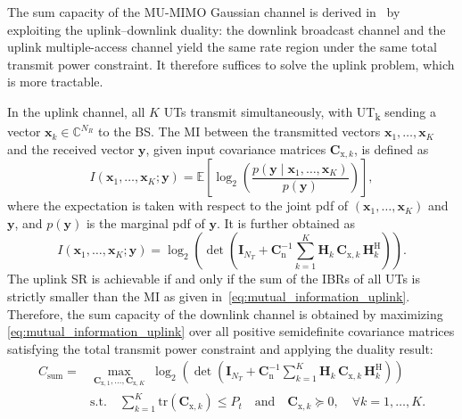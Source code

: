The sum capacity of the \ac{MU}-\ac{MIMO} Gaussian channel is derived in~\cite{viswanath_2002, viswanath_2003, yu_2004} by exploiting the uplink--downlink duality: the downlink broadcast channel and the uplink multiple-access channel yield
the same rate region under the same total transmit power constraint. It therefore suffices to solve the uplink problem, which is more tractable.

In the uplink channel, all $K$ \acp{UT} transmit simultaneously, with \ac{UT}\textsubscript{k} sending a vector $\mathbf{x}_k \in \mathbb{C}^{N_R}$ to the \ac{BS}.
The \ac{MI} between the transmitted vectors $\mathbf{x}_1, \dots, \mathbf{x}_K$ and the received vector $\mathbf{y}$, given input covariance matrices $\mathbf{C}_{\mathrm{x},k}$, is defined as
\begin{equation}
    I(\mathbf{x}_1, \dots, \mathbf{x}_K; \mathbf{y})
    = \mathbb{E}\!\left[ \log_2\!\left( \frac{p(\mathbf{y} \mid \mathbf{x}_1, \dots, \mathbf{x}_K)}{p(\mathbf{y})} \right) \right],
\label{eq:mutual_information_mu}
\end{equation}
where the expectation is taken with respect to the joint \ac{pdf} of $(\mathbf{x}_1, \dots, \mathbf{x}_K)$ and $\mathbf{y}$, and $p(\mathbf{y})$ is the marginal \ac{pdf} of $\mathbf{y}$.
It is further obtained as
\begin{equation}
    I(\mathbf{x}_1, \dots, \mathbf{x}_K; \mathbf{y})
    = \log_2\!\left(\det\!\left(\mathbf{I}_{N_T} + \mathbf{C}_{\mathrm{n}}^{-1} \sum_{k=1}^{K} \mathbf{H}_k\,\mathbf{C}_{\mathrm{x},k}\,\mathbf{H}_k^\mathrm{H} \right)\right).
\label{eq:mutual_information_uplink}
\end{equation}
The uplink \ac{SR} is achievable if and only if the sum of the \ac{IBR}s of all \acp{UT} is strictly smaller than the \ac{MI} as given in~\eqref{eq:mutual_information_uplink}. Therefore, the sum capacity of the downlink channel is obtained by maximizing \eqref{eq:mutual_information_uplink} over all positive semidefinite covariance matrices satisfying the total transmit power constraint and applying the duality result:
\begin{equation}
\begin{aligned}
    C_{\text{sum}} =& \max_{\mathbf{C}_{\mathrm{x},1}, \dots, \mathbf{C}_{\mathrm{x},K}} \; \log_2\!\left(\det\!\left(\mathbf{I}_{N_T} + \mathbf{C}_{\mathrm{n}}^{-1} \sum_{k=1}^{K} \mathbf{H}_k\,\mathbf{C}_{\mathrm{x},k}\,\mathbf{H}_k^\mathrm{H} \right)\right) \\
    &\text{s.t.} \quad \sum_{k=1}^{K} \mathrm{tr}\!\left(\mathbf{C}_{\mathrm{x},k}\right) \leq P_t \quad \text{and} \quad \mathbf{C}_{\mathrm{x},k} \succeq 0, \quad \forall k = 1, \dots, K.
\end{aligned}
\label{eq:sum_capacity_Gaussian_channel}
\end{equation}
